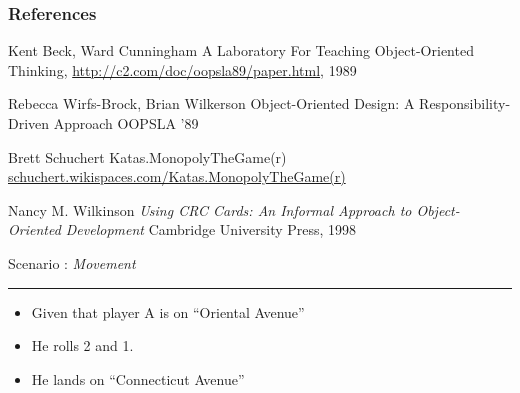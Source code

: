 \documentclass[handout,t,12pt]{beamer}
\newcommand{\Square}[1]{``#1''}
\newcounter{scenarioid}\setcounter{scenarioid}{0}
\newenvironment{scenario}[1]{%
\addtocounter{scenarioid}{1} 
{\Large Scenario \thescenarioid: \emph{#1}\\[3px]\hrule}
\vspace{1\bigskipamount}
}{%
}
\begin{document}
  \begin{frame}\frametitle{References}
      \begin{thebibliography}{10}
        
          Kent Beck, Ward Cunningham
          \newblock A Laboratory For Teaching Object-Oriented Thinking,
          \newblock \url{http://c2.com/doc/oopsla89/paper.html}, 1989

          Rebecca Wirfs-Brock, Brian Wilkerson
          \newblock Object-Oriented Design: A Responsibility-Driven Approach
          \newblock OOPSLA '89
          
          Brett Schuchert
          \newblock Katas.MonopolyTheGame(r)
          \newblock \url{schuchert.wikispaces.com/Katas.MonopolyTheGame(r)}

          Nancy M. Wilkinson
          \newblock \emph{Using CRC Cards: An Informal Approach to Object-Oriented Development}
          \newblock Cambridge University Press, 1998
        
        
    \end{thebibliography}
  \end{frame}

  
  \begin{frame}
    \begin{scenario}{Movement}
      \begin{itemize}
        \item Given that player A is on \Square{Oriental Avenue}
        \item He rolls 2 and 1.  
        \item He lands on \Square{Connecticut Avenue}
      \end{itemize}      
    \end{scenario}
  \end{frame}
\end{document}
